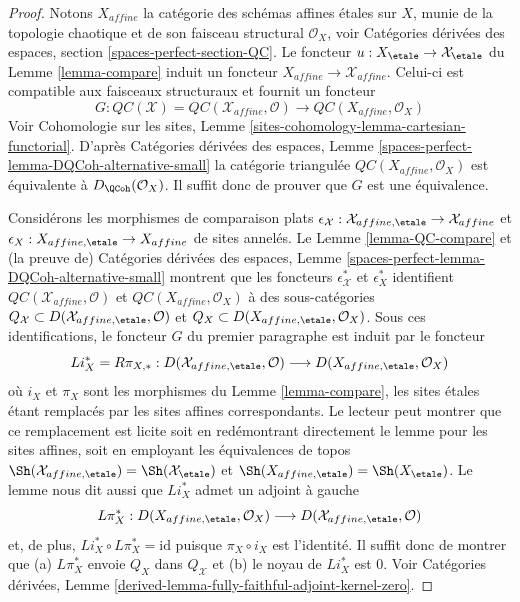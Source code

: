 \begin{proof}
Notons $X_{affine}$ la catégorie des schémas affines \'etales sur $X$,
munie de la topologie chaotique et de son faisceau structural $\mathcal{O}_X$, voir
Catégories dérivées des espaces, section \ref{spaces-perfect-section-QC}.
Le foncteur $u : X_\etale \to \mathcal{X}_\etale$ du Lemme \ref{lemma-compare}
induit un foncteur $X_{affine} \to \mathcal{X}_{affine}$.
Celui-ci est compatible aux faisceaux structuraux et fournit un foncteur
$$
G :
\mathit{QC}(\mathcal{X}) = \mathit{QC}(\mathcal{X}_{affine}, \mathcal{O})
\longrightarrow
\mathit{QC}(X_{affine}, \mathcal{O}_X)
$$
Voir
Cohomologie sur les sites, Lemme \ref{sites-cohomology-lemma-cartesian-functorial}.
D'après Catégories dérivées des espaces, Lemme
\ref{spaces-perfect-lemma-DQCoh-alternative-small}
la catégorie triangulée $\mathit{QC}(X_{affine}, \mathcal{O}_X)$
est équivalente à $D_\QCoh(\mathcal{O}_X)$. Il suffit donc de
prouver que $G$ est une équivalence.

\medskip\noindent
Considérons les morphismes de comparaison plats
$\epsilon_\mathcal{X} : \mathcal{X}_{affine, \etale} \to \mathcal{X}_{affine}$
et $\epsilon_X : X_{affine, \etale} \to X_{affine}$
de sites annelés. Le Lemme \ref{lemma-QC-compare} et
(la preuve de) Catégories dérivées des espaces, Lemme
\ref{spaces-perfect-lemma-DQCoh-alternative-small}
montrent que les foncteurs
$\epsilon_\mathcal{X}^*$ et $\epsilon_X^*$
identifient $\mathit{QC}(\mathcal{X}_{affine}, \mathcal{O})$
et $\mathit{QC}(X_{affine}, \mathcal{O}_X)$
à des sous-catégories
$Q_\mathcal{X} \subset D(\mathcal{X}_{affine, \etale}, \mathcal{O})$
et
$Q_X \subset D(X_{affine, \etale}, \mathcal{O}_X)$.
Sous ces identifications,
le foncteur $G$ du premier paragraphe est induit par le foncteur
$$
Li_X^* = R\pi_{X, *}:
D(\mathcal{X}_{affine, \etale}, \mathcal{O})
\longrightarrow
D(X_{affine, \etale}, \mathcal{O}_X)
$$
où $i_X$ et $\pi_X$ sont les morphismes du Lemme \ref{lemma-compare},
les sites \'etales étant remplacés par les sites affines correspondants.
Le lecteur peut montrer que ce remplacement est licite soit
en redémontrant directement le lemme pour les sites affines, soit
en employant les équivalences de topos
$\Sh(\mathcal{X}_{affine, \etale}) = \Sh(\mathcal{X}_\etale)$ et
$\Sh(X_{affine, \etale}) = \Sh(X_\etale)$.
Le lemme nous dit aussi que $Li_X^*$ admet un adjoint à gauche
$$
L\pi_X^*:
D(X_{affine, \etale}, \mathcal{O}_X)
\longrightarrow
D(\mathcal{X}_{affine, \etale}, \mathcal{O})
$$
et, de plus, $Li_X^* \circ L\pi_X^* = \text{id}$
puisque $\pi_X \circ i_X$ est l'identité. Il suffit donc
de montrer que (a) $L\pi_X^*$ envoie $Q_X$ dans $Q_\mathcal{X}$
et (b) le noyau de $Li_X^*$ est $0$.
Voir Catégories dérivées, Lemme
\ref{derived-lemma-fully-faithful-adjoint-kernel-zero}.


\end{proof}
